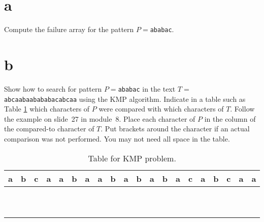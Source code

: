 \documentclass[12pt]{article}
\begin{document}
	\begin{enumerate}
		\part{a} Compute the failure array for the pattern $P=$\texttt{ababac}.
		
		\part{b}
		Show how to search for pattern $P=$\texttt{ababac} in the text $T=$\texttt{abcaabaabababacabcaa} using the KMP algorithm.
		Indicate in a table such as Table \ref{kmp} which characters of $P$ were compared with which characters of $T$. 
		Follow the example on slide~27 in module~8.
		Place each character of $P$ in the column of the compared-to character of $T$.  
		Put brackets around the character if an actual comparison was not performed. 
		You may not need all space in the table.
		
	\end{enumerate}
	\begin{table}
		\Large{
			\begin{center}
				\begin{tabular}{|c|c|c|c|c|c|c|c|c|c|c|c|c|c|c|c|c|c|c|c|}
					\hline
					a&b&c&a&a&b&a&a&b&a&b&a&b&a&c&a&b&c&a&a\\
					\hline
					\hline
					&&&&&&&&&&&&&&&&&&&\\
					\hline
					&&&&&&&&&&&&&&&&&&&\\
					\hline
					&&&&&&&&&&&&&&&&&&&\\
					\hline
					&&&&&&&&&&&&&&&&&&&\\
					\hline
					&&&&&&&&&&&&&&&&&&&\\
					\hline
					&&&&&&&&&&&&&&&&&&&\\
					\hline
					&&&&&&&&&&&&&&&&&&&\\
					\hline
					&&&&&&&&&&&&&&&&&&&\\
					\hline
					&&&&&&&&&&&&&&&&&&&\\
					\hline
					&&&&&&&&&&&&&&&&&&&\\
					\hline
				\end{tabular}
		\end{center}}
		\caption{Table for KMP problem.}\label{kmp}
	\end{table}
	
	
\end{document}

